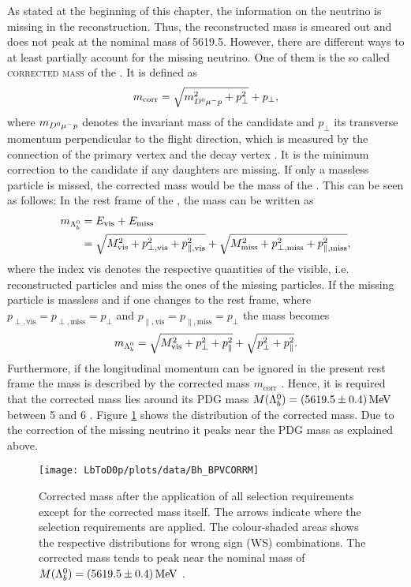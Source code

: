 As stated at the beginning of this chapter, the information on the neutrino is missing in the reconstruction.
Thus, the reconstructed \Lb mass is smeared out and does not peak at the nominal \Lb mass of 5619.5\mev.
However, there are different ways to at least partially account for the missing neutrino.
One of them is the so called \textsc{corrected mass} of the \Lb.
It is defined as
\begin{align}
    m_{\text{corr}} = \sqrt{m_{{{D}^0}{\mu^-}{p}}^2 + p_{\perp}^2} + p_{\perp}, \label{eq:correctedMass}
\end{align}
where $m_{{{D}^0}{\mu^-}{p}}$ denotes the invariant mass of the \Dz\mun\proton candidate and $p_\perp$ its transverse momentum perpendicular to the \Lb flight direction, which is measured by the connection of the primary vertex and the \Lb decay vertex \cite{CorrectedMass}.
It is the minimum correction to the \Lb candidate if any daughters are missing.
If only a massless particle is missed, the corrected mass would be the mass of the \Lb \cite{HLT2_Topological}.
This can be seen as follows:
In the rest frame of the \Lb, the \Lb mass can be written as
\begin{align}
    m_{{{\Lambda}^0_{b}}} &= E_{\text{vis}} + E_{\text{miss}} \\
            &= \sqrt{M_{\text{vis}}^2 + p_{\perp, \text{vis}}^2 + p_{\parallel, \text{vis}}^2} + \sqrt{M_{\text{miss}}^2 + p_{\perp, \text{miss}}^2 + p_{\parallel, \text{miss}}^2},
\end{align}
where the index vis denotes the respective quantities of the visible, i.e. reconstructed particles and miss the ones of the missing particles.
If the missing particle is massless and if one changes to the \Lb rest frame, where $p_{\perp, \text{vis}} = p_{\perp, \text{miss}} = p_\perp$ and $p_{\parallel, \text{vis}} = p_{\parallel, \text{miss}} = p_\perp$ the \Lb mass becomes
\begin{align}
    m_{{{\Lambda}^0_{b}}} = \sqrt{M_{\text{vis}}^2 + p_{\perp}^2 + p_{\parallel}^2} + \sqrt{p_{\perp}^2 + p_{\parallel}^2}.
\end{align}
Furthermore, if the longitudinal momentum can be ignored in the present rest frame the \Lb mass is described by the corrected mass $m_\text{corr}$ \cite{bQuark_LEP, Kodama:1991ij}.
Hence, it is required that the corrected \Lb mass lies around its PDG mass $M({{\Lambda}^0_{b}})=(5619.5 \pm 0.4)\mathrm{\,Me\kern -0.1em V}$ \cite{PDG} between 5 and 6 \gev.
Figure \ref{fig:plot_correctedMass} shows the distribution of the corrected \Lb mass.
Due to the correction of the missing neutrino it peaks near the PDG mass as explained above.
\begin{figure}[tb]
	\centering
	\texttt{[image: LbToD0p/plots/data/Bh\_BPVCORRM]}
	\caption{Corrected \Lb mass after the application of all selection requirements except for the corrected \Lb mass itself.
             The arrows indicate where the selection requirements are applied.
             The colour-shaded areas shows the respective distributions for wrong sign (WS) combinations.
             The corrected \Lb mass tends to peak near the nominal \Lb mass of $M({{\Lambda}^0_{b}})=(5619.5 \pm 0.4)\mathrm{\,Me\kern -0.1em V}$ \cite{PDG}.}
	\label{fig:plot_correctedMass}
\end{figure}

